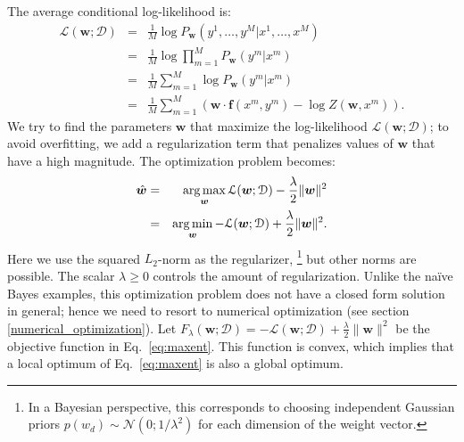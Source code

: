 The average conditional log-likelihood is: 
\begin{eqnarray}
\mathcal{L}(\boldsymbol{w}; \mathcal{D}) &=& 
\frac{1}{M}\log P_{\boldsymbol{w}}(y^1,\ldots,y^M | x^1,\ldots,x^M) \nonumber\\
&=& \frac{1}{M}\log \prod_{m=1}^M P_{\boldsymbol{w}}(y^m | x^m)\nonumber\\
&=&  \frac{1}{M}\sum_{m=1}^M \log P_{\boldsymbol{w}}(y^m | x^m)\nonumber\\
&=&  \frac{1}{M}\sum_{m=1}^M \left( \boldsymbol{w} \cdot \boldsymbol{f}(x^m,y^m) 
- \log Z(\boldsymbol{w},x^m)\right). 
\end{eqnarray}
We try to find the parameters $\boldsymbol{w}$ that maximize the log-likelihood 
$\mathcal{L}(\boldsymbol{w}; \mathcal{D})$; to avoid overfitting, 
we add a
regularization term that penalizes values of $\boldsymbol{w}$ that have a high
magnitude. The optimization problem becomes:
\begin{eqnarray}\label{eq:maxent} 
\hat{\boldsymbol{w}} &=& 
\operatorname*{arg\,max}_{\boldsymbol{w}} \mathcal{L}(\boldsymbol{w}; \mathcal{D})  - \frac{\lambda}{2} \|\boldsymbol{w}\|^2 \nonumber\\
&=& 
\operatorname*{arg\,min}_{\boldsymbol{w}} -\mathcal{L}(\boldsymbol{w}; \mathcal{D}) + \frac{\lambda}{2} \|\boldsymbol{w}\|^2.
\end{eqnarray} 
Here we use the squared $L_2$-norm as the regularizer,%
\footnote{In a Bayesian perspective, this corresponds to choosing independent Gaussian priors 
$p(w_d) \sim \mathcal{N}(0; 1/\lambda^2)$ for each dimension of the weight vector.} %
but other norms are possible. The scalar $\lambda \ge 0$ controls the amount of regularization. 
Unlike the na\"ive Bayes examples, this optimization problem does not have a closed form solution in general; hence we need to resort to 
numerical optimization (see section \ref{numerical_optimization}). 
Let $F_{\lambda}(\boldsymbol{w}; \mathcal{D}) = -\mathcal{L}(\boldsymbol{w}; \mathcal{D}) + \frac{\lambda}{2} \|\boldsymbol{w}\|^2$ 
be the objective function in Eq.~\ref{eq:maxent}.  This function is convex, which implies that a local optimum of Eq.~\ref{eq:maxent} is also a global optimum. 
